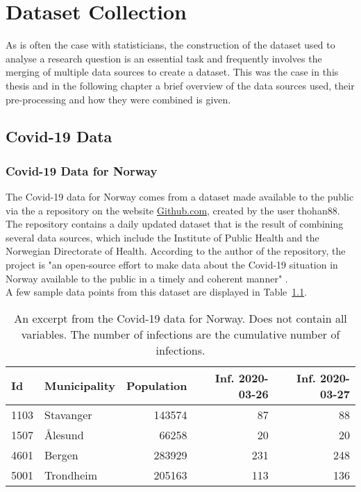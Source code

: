 %
\chapter{Dataset Collection}
As is often the case with statisticians, the construction of the dataset used to analyse a research question is an essential task and frequently involves the merging of multiple data sources to create a dataset. This was the case in this thesis and in the following chapter a brief overview of the data sources used, their pre-processing and how they were combined is given.
\label{sec:datacollection}
\clearpage
\section{Covid-19 Data}
\subsection{Covid-19 Data for Norway}
The Covid-19 data for Norway comes from a dataset made available to the public via the a repository on the website \href{https://www.github.com}{Github.com}, created by the user thohan88. The repository contains a daily updated dataset that is the result of combining several data sources, which include the Institute of Public Health and the Norwegian Directorate of Health. According to the author of the repository, the project is "an open-source effort to make data about the Covid-19 situation in Norway available to the public in a timely and coherent manner" \autocite[][]{thohan88}. \\
A few sample data points from this dataset are displayed in Table~\ref{datasetNorge}.\\
\begin{table}[H] 
\caption{An excerpt from the Covid-19 data for Norway. Does not contain all variables. The number of infections are the cumulative number of infections. \label{datasetNorge}}
\begin{tabular}{l l r r r}
\toprule
\textbf{Id}	& \textbf{Municipality}	& \textbf{Population}	& \textbf{Inf. 2020-03-26}	& \textbf{Inf. 2020-03-27}\\
\midrule
1103 & Stavanger & 143574 & 87 & 88 \\
1507 & Ålesund & 66258 & 20 & 20 \\
4601 & Bergen & 283929 & 231 & 248 \\
5001 & Trondheim & 205163 & 113 & 136 \\
\bottomrule
\end{tabular}
\end{table}
